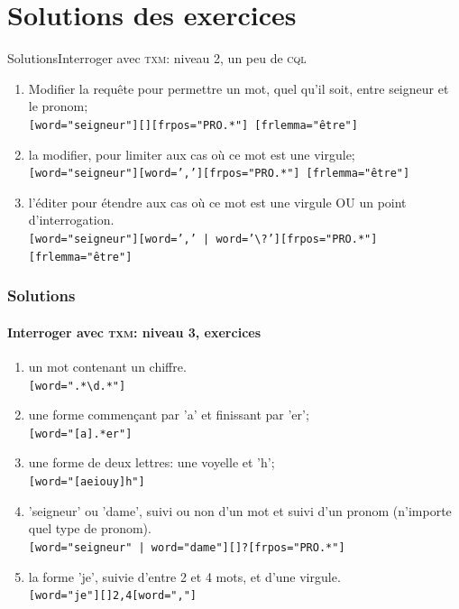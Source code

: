 \documentclass{beamer}
\begin{document}


\appendix

\section{Solutions des exercices}

\begin{frame}{Solutions}{Interroger avec \textsc{txm}: niveau 2, un peu de \textsc{cql}}

\begin{enumerate}
	\item Modifier la requête pour permettre un mot, quel qu'il soit, entre seigneur et le pronom;\\
	\texttt{[word="seigneur"][][frpos="PRO.*"] [frlemma="être"]}
	\item la modifier, pour limiter aux cas où ce mot est une virgule;\\
	\texttt{[word="seigneur"][word=','][frpos="PRO.*"] [frlemma="être"] }
	\item l'éditer pour étendre aux cas où ce mot est une virgule OU un point d'interrogation.\\
	\texttt{[word="seigneur"][word=',' | word='\textbackslash?'][frpos="PRO.*"] [frlemma="être"] }
\end{enumerate}

\end{frame}

\begin{frame}[fragile]
\frametitle{Solutions}
\framesubtitle{Interroger avec \textsc{txm}: niveau 3, exercices}

\begin{enumerate}
	\item un mot contenant un chiffre.\\
	\texttt{[word=".*\textbackslash{}d.*"]}
	\item une forme commençant par 'a' et finissant par 'er';\\
	\texttt{[word="[a].*er"]}
	\item une forme de deux lettres: une voyelle et 'h';\\
	\texttt{[word="[aeiouy]h"]}
	\item 'seigneur' ou 'dame', suivi ou non d'un mot et suivi d'un pronom (n'importe quel type de pronom).\\
	\texttt{[word="seigneur" | word="dame"][]?[frpos="PRO.*"]}
	\item la forme 'je', suivie d'entre 2 et 4 mots, et d'une virgule.\\
	\texttt{[word="je"][]{2,4}[word=","]}
\end{enumerate}

\end{frame}
\end{document}
